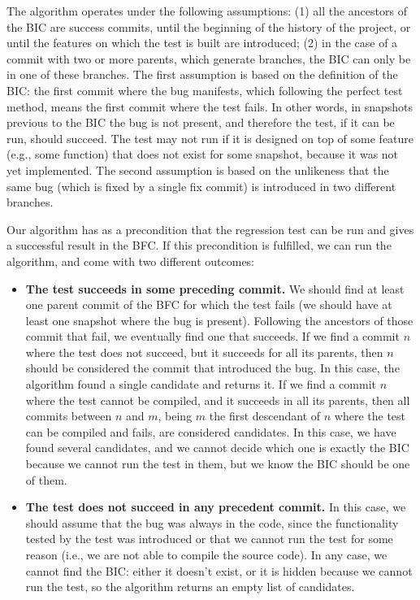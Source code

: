 The algorithm operates under the following assumptions: (1) all the ancestors of the BIC are success commits, until the beginning of the history of the project, or until the features on which the test is built are introduced; (2) in the case of a commit with two or more parents, which generate branches, the BIC can only be in one of these branches.
The first assumption is based on the definition of the BIC: the first commit where the bug manifests, which following the perfect test method, means the first commit where the test fails. In other words, in snapshots previous to the BIC the bug is not present, and therefore the test, if it can be run, should succeed. The test may not run if it is designed on top of some feature (e.g., some function) that does not exist for some snapshot, because it was not yet implemented.
The second assumption is based on the unlikeness that the same bug (which is fixed by a single fix commit) is introduced in two different branches. 

Our algorithm has as a precondition that the regression test can be run and gives a successful result in the BFC.
If this precondition is fulfilled, we can run the algorithm, and come with two different outcomes:

\begin{itemize}
\item \textbf{The test succeeds in some preceding commit.}
  We should find at least one parent commit of the BFC for which the test fails (we should have at least one snapshot where the bug is present). 
  Following the ancestors of those commit that fail, we eventually find one that succeeds. 
  If we find a commit $n$ where the test does not succeed, but it succeeds for all its parents, then $n$ should be considered the commit that introduced the bug. 
  In this case, the algorithm found a single candidate and returns it. If we find a commit $n$ where the test cannot be compiled, and it succeeds in all its parents, then all commits between $n$ and $m$, being $m$ the first descendant of $n$ where the test can be compiled and fails, are considered candidates. 
  In this case, we have found several candidates, and we cannot decide which one is exactly the BIC because we cannot run the test in them, but we know the BIC should be one of them.
\item \textbf{The test does not succeed in any precedent commit.}
  In this case, we should assume that the bug was always in the code, since the functionality tested by the test was introduced or that we cannot run the test for some reason (i.e., we are not able to compile the source code). In any case, we cannot find the BIC: either it doesn't exist, or it is hidden because we cannot run the test, so the algorithm returns an empty list of candidates.
\end{itemize}

